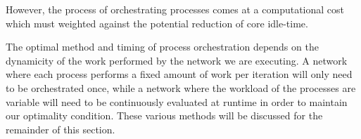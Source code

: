 However, the process of orchestrating processes comes at a
computational cost which must weighted against the potential reduction
of core idle-time.

The optimal method and timing of process orchestration depends on the
dynamicity  of the work
performed by the network we are executing. A network where each
process performs a fixed amount of work per iteration will only need
to be orchestrated once, while a network where the workload of the
processes are variable will need to be continuously evaluated at
runtime in order to maintain our optimality condition. These various
methods will be discussed for the remainder of this section.


